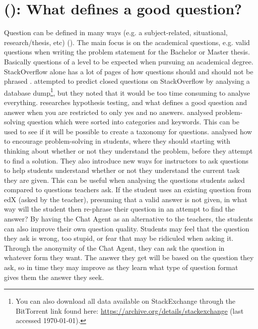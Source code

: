 \section{ (): What defines a good question?}
\label{chapter3:define_good_question}
Question can be defined in many ways (e.g. a subject-related, situational, research/thesis, etc) (\citet[p.~3]{Boyer2010}). The main focus is on the academical questions, e.g. 
valid questions when writing the problem statement for the Bachelor or Master thesis. Basically questions of a level to be expected when pursuing an academical degree. 
StackOverflow alone has a lot of pages of how questions should and should not be phrased  \cite{Stackoverflow.com2015,CommunityWiki2015,Stackoverflow.com2015a,Stackoverflow.com2015b,Stackoverflow.com2015c}. 
\citet{Lezina2013} attempted to predict closed questions on StackOverflow by analysing a database dump\footnote{You can also download all data available on StackExchange through 
	the BitTorrent link found here: \url{https://archive.org/details/stackexchange} (last accessed \today).}, but they noted that it would be too time consuming to analyse 
everything. \citet{Slowiaczek1992} researches hypothesis testing, and what defines a good question and answer when you are restricted to only yes and no answers.
\vspace{0.5em}\newline
\citet{Ragonis2013} analysed problem-solving question which were sorted into categories and keywords. This can be used to see if it will be possible to create a taxonomy for 
questions. \citet{Boyer2010} analysed how to encourage problem-solving in students, where they should starting with thinking about whether or not they understand the problem, 
before they attempt to find a solution. They also introduce new ways for instructors to ask questions to help students understand whether or not they understand the current task 
they are given. This can be useful when analysing the questions students asked compared to questions teachers ask. If the student uses an existing question from edX (asked by the 
teacher), presuming that a valid answer is not given, in what way will the student then re-phrase their question in an attempt to find the answer? 
\vspace{0.5em}\newline
By having the Chat Agent as an alternative to the teachers, the students can also improve their own question quality. Students may feel that the question they ask is wrong, too 
stupid, or fear that may be ridiculed when asking it. Through the anonymity of the Chat Agent, they can ask the question in whatever form they want. The answer they get will be 
based on the question they ask, so in time they may improve as they learn what type of question format gives them the answer they seek. 

\begin{comment}
I would argue that there are many different types of question. 
There are structured queries, where can be object, which query to longer to process. 
The next layer is information gathering questions. Questions designed to get information.
\end{comment}
